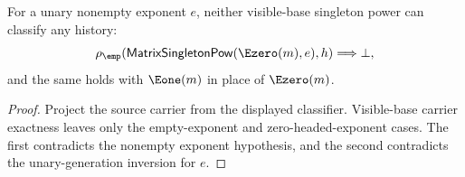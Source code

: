 \begin{theorem}
\label{thm:matrix-singleton-pow-positive-exponent-visible-base-classifier-absurd}
For a unary nonempty exponent \(e\), neither visible-base singleton power can
classify any history:
$$
\rho_{\emp}(\mathsf{MatrixSingletonPow}(\Ezero(m),e),h)\Longrightarrow\bot,
$$
and the same holds with \(\Eone(m)\) in place of \(\Ezero(m)\).
\end{theorem}
\begin{proof}
Project the source carrier from the displayed classifier. Visible-base carrier
exactness leaves only the empty-exponent and zero-headed-exponent cases. The
first contradicts the nonempty exponent hypothesis, and the second contradicts
the unary-generation inversion for \(e\).
\end{proof}
